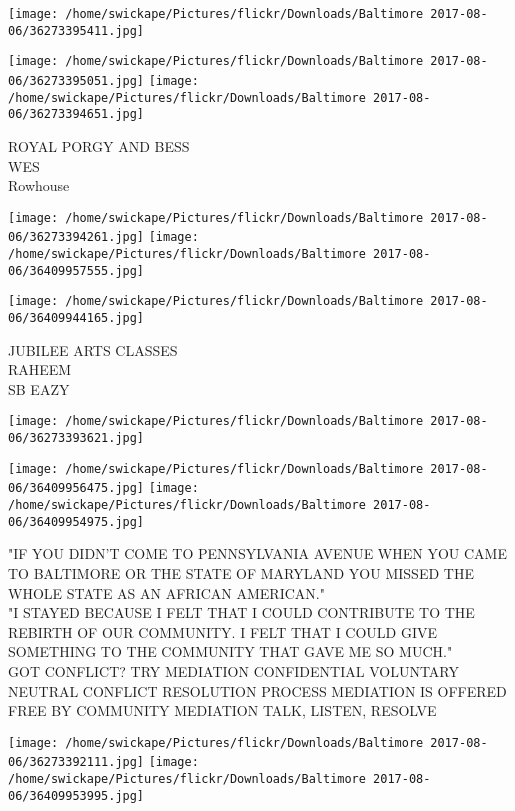 \documentclass[10pt,letterpaper]{article}
\begin{document}
\texttt{[image: /home/swickape/Pictures/flickr/Downloads/Baltimore 2017-08-06/36273395411.jpg]}

\vspace{0.25in}
\texttt{[image: /home/swickape/Pictures/flickr/Downloads/Baltimore 2017-08-06/36273395051.jpg]}
\texttt{[image: /home/swickape/Pictures/flickr/Downloads/Baltimore 2017-08-06/36273394651.jpg]}

ROYAL PORGY AND BESS\\
WES\\
Rowhouse\\
\pagebreak

\texttt{[image: /home/swickape/Pictures/flickr/Downloads/Baltimore 2017-08-06/36273394261.jpg]}
\texttt{[image: /home/swickape/Pictures/flickr/Downloads/Baltimore 2017-08-06/36409957555.jpg]}

\vspace{0.25in}
\texttt{[image: /home/swickape/Pictures/flickr/Downloads/Baltimore 2017-08-06/36409944165.jpg]}

JUBILEE ARTS CLASSES\\
RAHEEM\\
SB EAZY\\
\pagebreak

\texttt{[image: /home/swickape/Pictures/flickr/Downloads/Baltimore 2017-08-06/36273393621.jpg]}

\vspace{0.25in}
\texttt{[image: /home/swickape/Pictures/flickr/Downloads/Baltimore 2017-08-06/36409956475.jpg]}
\texttt{[image: /home/swickape/Pictures/flickr/Downloads/Baltimore 2017-08-06/36409954975.jpg]}

"IF YOU DIDN'T COME TO PENNSYLVANIA AVENUE WHEN YOU CAME TO BALTIMORE OR THE STATE OF MARYLAND YOU MISSED THE WHOLE STATE AS AN AFRICAN AMERICAN."\\
"I STAYED BECAUSE I FELT THAT I COULD CONTRIBUTE TO THE REBIRTH OF OUR COMMUNITY.  I FELT THAT I COULD GIVE SOMETHING TO THE COMMUNITY THAT GAVE ME SO MUCH."\\
GOT CONFLICT?  TRY MEDIATION CONFIDENTIAL VOLUNTARY NEUTRAL CONFLICT RESOLUTION PROCESS MEDIATION IS OFFERED FREE BY COMMUNITY MEDIATION TALK, LISTEN, RESOLVE\\
\pagebreak

\texttt{[image: /home/swickape/Pictures/flickr/Downloads/Baltimore 2017-08-06/36273392111.jpg]}
\texttt{[image: /home/swickape/Pictures/flickr/Downloads/Baltimore 2017-08-06/36409953995.jpg]}
\end{document}
